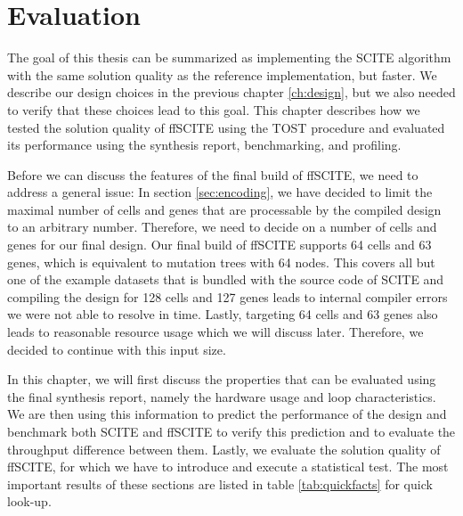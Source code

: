 \chapter{Evaluation}
\label{ch:evaluation}

The goal of this thesis can be summarized as implementing the \ac{SCITE} algorithm with the same solution quality as the reference implementation, but faster. We describe our design choices in the previous chapter \ref{ch:design}, but we also needed to verify that these choices lead to this goal. This chapter describes how we tested the solution quality of \ac{ffSCITE} using the \ac{TOST} procedure \cite{schuirmann1987comparison} and evaluated its performance using the synthesis report, benchmarking, and profiling. 

Before we can discuss the features of the final build of \ac{ffSCITE}, we need to address a general issue: In section \ref{sec:encoding}, we have decided to limit the maximal number of cells and genes that are processable by the compiled design to an arbitrary number. Therefore, we need to decide on a number of cells and genes for our final design. Our final build of \ac{ffSCITE} supports 64 cells and 63 genes, which is equivalent to mutation trees with 64 nodes. This covers all but one of the example datasets that is bundled with the source code of \ac{SCITE} and compiling the design for 128 cells and 127 genes leads to internal compiler errors we were not able to resolve in time. Lastly, targeting 64 cells and 63 genes also leads to reasonable resource usage which we will discuss later. Therefore, we decided to continue with this input size.

In this chapter, we will first discuss the properties that can be evaluated using the final synthesis report, namely the hardware usage and loop characteristics. We are then using this information to predict the performance of the design and benchmark both \ac{SCITE} and \ac{ffSCITE} to verify this prediction and to evaluate the throughput difference between them. Lastly, we evaluate the solution quality of \ac{ffSCITE}, for which we have to introduce and execute a statistical test. The most important results of these sections are listed in table \ref{tab:quickfacts} for quick look-up.

